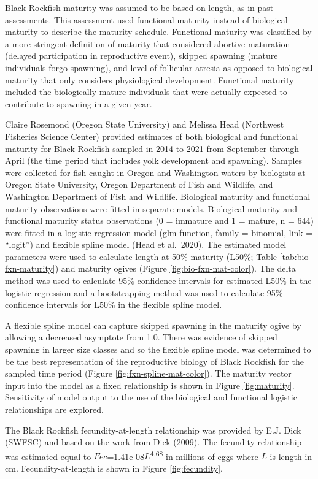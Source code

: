 \documentclass[11pt,
  english,
  letterpaper,
]{article}
\begin{document}
Black Rockfish maturity was assumed to be based on length, as in past assessments. This assessment used functional maturity instead of biological maturity to describe the maturity schedule. Functional maturity was classified by a more stringent definition of maturity that considered abortive maturation (delayed participation in reproductive event), skipped spawning (mature individuals forgo spawning), and level of follicular atresia as opposed to biological maturity that only considers physiological development. Functional maturity included the biologically mature individuals that were actually expected to contribute to spawning in a given year.

Claire Rosemond (Oregon State University) and Melissa Head (Northwest Fisheries Science Center) provided estimates of both biological and functional maturity for Black Rockfish sampled in 2014 to 2021 from September through April (the time period that includes yolk development and spawning). Samples were collected for fish caught in Oregon and Washington waters by biologists at Oregon State University, Oregon Department of Fish and Wildlife, and Washington Department of Fish and Wildlife. Biological maturity and functional maturity observations were fitted in separate models. Biological maturity and functional maturity status observations (0 = immature and 1 = mature, n = 644) were fitted in a logistic regression model (glm function, family = binomial, link = ``logit'') and flexible spline model (Head et al.~2020). The estimated model parameters were used to calculate length at 50\% maturity (L50\%; Table \ref{tab:bio-fxn-maturity}) and maturity ogives (Figure \ref{fig:bio-fxn-mat-color}). The delta method was used to calculate 95\% confidence intervals for estimated L50\% in the logistic regression and a bootstrapping method was used to calculate 95\% confidence intervals for L50\% in the flexible spline model.

A flexible spline model can capture skipped spawning in the maturity ogive by allowing a decreased asymptote from 1.0. There was evidence of skipped spawning in larger size classes and so the flexible spline model was determined to be the best representation of the reproductive biology of Black Rockfish for the sampled time period (Figure \ref{fig:fxn-spline-mat-color}). The maturity vector input into the model as a fixed relationship is shown in Figure \ref{fig:maturity}. Sensitivity of model output to the use of the biological and functional logistic relationships are explored.

The Black Rockfish fecundity-at-length relationship was provided by E.J. Dick (SWFSC) and based on the work from Dick (2009). The fecundity relationship was estimated equal to \(Fec\)=1.41e-08\(L\)\textsuperscript{4.68} in millions of eggs where \(L\) is length in cm. Fecundity-at-length is shown in Figure \ref{fig:fecundity}.
\end{document}
